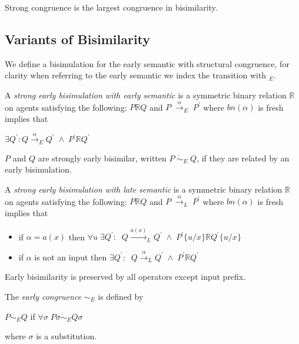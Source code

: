 \begin{proposition}
  Strong congruence is the largest congruence in bisimilarity.
\end{proposition}

\subsection{Variants of Bisimilarity}

We define a bisimulation for the early semantic with structural congruence, for clarity when referring to the early semantic we index the transition with $ _{E}$. 
\begin{definition}
  A \emph{strong early bisimulation with early semantic} is a symmetric binary relation $\mathbb{R}$ on agents satisfying the following: $P\mathbb{R} Q$ and $P\; \xrightarrow{\alpha}_{E}\; P^{'}$ where $bn(\alpha)$ is fresh implies that
  \begin{center}
    $\exists Q^{'}: Q\xrightarrow{\alpha}_{E}Q^{'}\; \wedge\; P^{'}\mathbb{R}Q^{'}$
  \end{center}
  $P$ and $Q$ are strongly early bisimilar, written $P\; \dot{\sim}_{E}\; Q$, if they are related by an early bisimulation.
\end{definition}

\begin{definition}
  A \emph{strong early bisimulation with late semantic} is a symmetric binary relation $\mathbb{R}$ on agents satisfying the following: $P\mathbb{R} Q$ and $P\; \xrightarrow{\alpha}_{L}\; P^{'}$ where $bn(\alpha)$ is fresh implies that
  \begin{itemize}
    \item
      if $\alpha=a(x)$ then $\forall u\; \exists Q^{'}:\;\; Q\xrightarrow{a(x)}_{L}Q^{'}\; \wedge\; P^{'}\{u/x\}\mathbb{R}Q^{'}\{u/x\}$
    \item
      if $\alpha$ is not an input then $\exists Q^{'}:\;\; Q\xrightarrow{\alpha}_{L}Q^{'}\; \wedge\; P^{'}\mathbb{R}Q^{'}$
  \end{itemize}
\end{definition}

\begin{proposition}
  Early bisimilarity is preserved by all operators except input prefix. 
\end{proposition}


\begin{definition}
  The \emph{early congruence} $\sim_{E}$ is defined by
  \begin{center}
    $P\sim_{E} Q$ if $\forall \sigma\; P\sigma \dot{\sim}_{E} Q\sigma$
  \end{center}
  where $\sigma$ is a substitution.
\end{definition}

